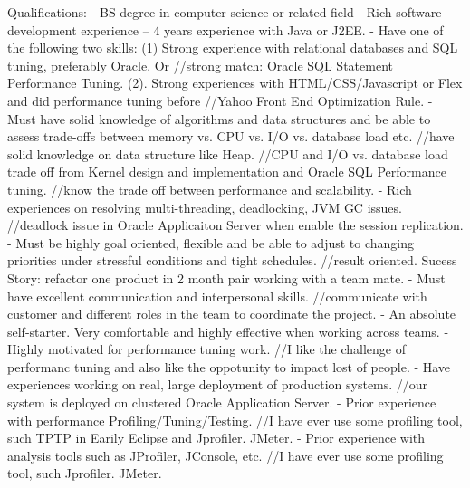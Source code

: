 Qualifications:
- BS degree in computer science or related field
- Rich software development experience -- 4 years experience with Java or J2EE.
- Have one of the following two skills:
(1) Strong experience with relational databases and SQL tuning, preferably Oracle. Or
//strong match: Oracle SQL Statement Performance Tuning.
(2). Strong experiences with HTML/CSS/Javascript or Flex and did performance tuning before
//Yahoo Front End Optimization Rule.
- Must have solid knowledge of algorithms and data structures and be able to assess trade-offs between memory vs. CPU vs. I/O vs. database load etc.
//have solid knowledge on data structure like Heap.
//CPU and I/O vs. database load trade off from Kernel design and implementation and Oracle SQL Performance tuning.
//know the trade off between performance and scalability.
- Rich experiences on resolving multi-threading, deadlocking, JVM GC issues.
//deadlock issue in Oracle Applicaiton Server when enable the session replication.
- Must be highly goal oriented, flexible and be able to adjust to changing priorities under stressful conditions and tight schedules.
//result oriented. Sucess Story: refactor one product in 2 month pair working with a team mate.
- Must have excellent communication and interpersonal skills.
//communicate with customer and different roles in the team to coordinate the project.
- An absolute self-starter. Very comfortable and highly effective when working across teams.
- Highly motivated for performance tuning work.
//I like the challenge of performanc tuning and also like the oppotunity to impact lost of people.
- Have experiences working on real, large deployment of production systems.
//our system is deployed on clustered Oracle Application Server.
- Prior experience with performance Profiling/Tuning/Testing.
//I have ever use some profiling tool, such TPTP in Earily Eclipse and Jprofiler. JMeter.
- Prior experience with analysis tools such as JProfiler, JConsole, etc.
//I have ever use some profiling tool, such Jprofiler. JMeter.


